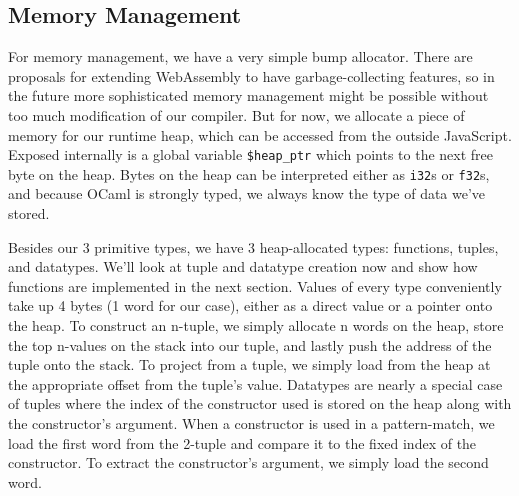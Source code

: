 \documentclass[12pt,a4paper,twoside,openright]{report}
\begin{document}
\subsection{Memory Management}
For memory management, we have a very simple bump allocator.
There are proposals for extending WebAssembly to have garbage-collecting features, so in the future more sophisticated memory management might be possible without too much modification of our compiler.
But for now, we allocate a piece of memory for our runtime heap, which can be accessed from the outside JavaScript.
Exposed internally is a global variable {\tt \$heap\_ptr} which points to the next free byte on the heap.
Bytes on the heap can be interpreted either as {\tt i32}s or {\tt f32}s, and because OCaml is strongly typed, we always know the type of data we've stored.

Besides our 3 primitive types, we have 3 heap-allocated types: functions, tuples, and datatypes.
We'll look at tuple and datatype creation now and show how functions are implemented in the next section.
Values of every type conveniently take up 4 bytes (1 word for our case), either as a direct value or a pointer onto the heap.
To construct an n-tuple, we simply allocate n words on the heap, store the top n-values on the stack into our tuple, and lastly push the address of the tuple onto the stack.
To project from a tuple, we simply load from the heap at the appropriate offset from the tuple's value.
Datatypes are nearly a special case of tuples where the index of the constructor used is stored on the heap along with the constructor's argument.
When a constructor is used in a pattern-match, we load the first word from the 2-tuple and compare it to the fixed index of the constructor.
To extract the constructor's argument, we simply load the second word.
\end{document}

